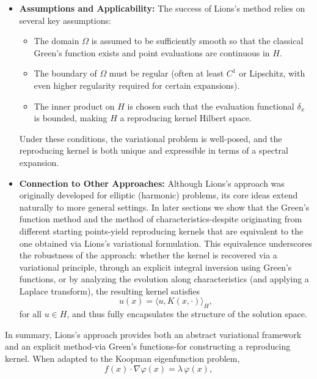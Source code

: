 \documentclass[11pt]{article}
\theoremstyle{plain}
\def\[{\begin{equation}}
\def\]{\end{equation}}
\begin{document}
\begin{itemize}
    \item \textbf{Assumptions and Applicability:}  
        The success of Lions’s method relies on several key assumptions:
        \begin{itemize}
            \item The domain \(\Omega\) is assumed to be sufficiently smooth so that the classical Green’s function exists and point evaluations are continuous in \(H\).
            \item The boundary of \(\Omega\) must be regular (often at least \(C^1\) or Lipschitz, with even higher regularity required for certain expansions).
            \item The inner product on \(H\) is chosen such that the evaluation functional \( \delta_x \) is bounded, making \(H\) a reproducing kernel Hilbert space.
        \end{itemize}
        Under these conditions, the variational problem is well-posed, and the reproducing kernel is both unique and expressible in terms of a spectral expansion.
    
    \item \textbf{Connection to Other Approaches:}  
        Although Lions’s approach was originally developed for elliptic (harmonic) problems, its core ideas extend naturally to more general settings. In later sections we show that the Green’s function method and the method of characteristics-despite originating from different starting points-yield reproducing kernels that are equivalent to the one obtained via Lions’s variational formulation. This equivalence underscores the robustness of the approach: whether the kernel is recovered via a variational principle, through an explicit integral inversion using Green’s functions, or by analyzing the evolution along characteristics (and applying a Laplace transform), the resulting kernel satisfies
        \[
        u(x)= \langle u, K(x,\cdot)\rangle_H,
        \]
        for all \(u\in H\), and thus fully encapsulates the structure of the solution space.
\end{itemize}

In summary, Lions’s approach provides both an abstract variational framework and an explicit method-via Green’s functions-for constructing a reproducing kernel. When adapted to the Koopman eigenfunction problem,
\[
f(x)\cdot \nabla \varphi(x)= \lambda\,\varphi(x),
\]
\end{document}
